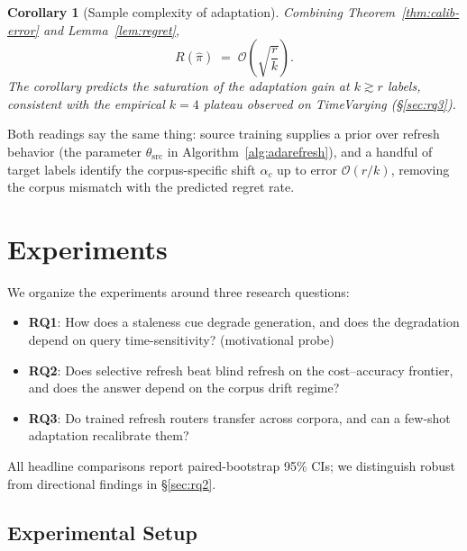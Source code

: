 \documentclass[pdflatex,sn-basic]{sn-jnl}
\newtheorem{corollary}{Corollary}
\begin{document}
\begin{corollary}[Sample complexity of adaptation]
\label{cor:rate}
Combining Theorem~\ref{thm:calib-error} and Lemma~\ref{lem:regret},
\[
R(\hat\pi) \;=\; \mathcal{O}\!\left(\sqrt{\frac{r}{k}}\right).
\]
The corollary predicts the saturation of the adaptation gain at $k \gtrsim r$ labels, consistent with the empirical $k{=}4$ plateau observed on TimeVarying (§\ref{sec:rq3}).
\end{corollary}

\noindent Both readings say the same thing: source training supplies a prior over refresh behavior (the parameter $\theta_{\mathrm{src}}$ in Algorithm~\ref{alg:adarefresh}), and a handful of target labels identify the corpus-specific shift $\alpha_c$ up to error $\mathcal{O}(r/k)$, removing the corpus mismatch with the predicted regret rate.

\section{Experiments}
\label{sec:exp}

We organize the experiments around three research questions:
\begin{itemize}
  \item \textbf{RQ1}: How does a staleness cue degrade generation, and does the degradation depend on query time-sensitivity? (motivational probe)
  \item \textbf{RQ2}: Does selective refresh beat blind refresh on the cost--accuracy frontier, and does the answer depend on the corpus drift regime?
  \item \textbf{RQ3}: Do trained refresh routers transfer across corpora, and can a few-shot adaptation recalibrate them?
\end{itemize}
All headline comparisons report paired-bootstrap 95\% CIs; we distinguish robust from directional findings in §\ref{sec:rq2}.

\subsection{Experimental Setup}
\label{sec:setup}
\end{document}
